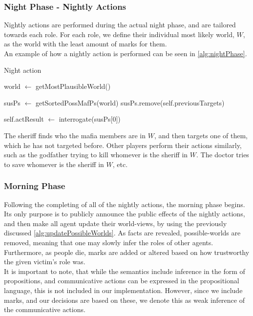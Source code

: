 \subsubsection{Night Phase - Nightly
	Actions}\label{sec:nightPhaseNightlyActions}
Nightly actions are performed during the actual night phase, and are tailored
towards each role. For each role, we define their individual most likely world,
$W$, as the world with the least amount of marks for them. \\ An example of how
a nightly action is performed can be seen in \cref{alg:nightPhase}.
\begin{algorithm}[H]
	\caption{Night action}
	\begin{algorithmic}[1]
		\State world $\gets$ getMostPlausibleWorld()

		\State susPs $\gets$ getSortedPossMafPs(world)
		\State susPs.remove(self.previousTargets)

		\State self.actResult $\gets$ interrogate(susPs[0])
		\EndIf
		\EndFunction

		\Statex
	\end{algorithmic}\label{alg:nightPhase}
\end{algorithm}
\setcounter{algorithmcaption}{7}
The sheriff finds who the mafia members are in $W$, and then targets one of
them, which he has not targeted before. Other players perform their actions
similarly, such as the godfather trying to kill whomever is the sheriff in $W$.
The doctor tries to save whomever is the sheriff in $W$, etc.

\subsubsection{Morning Phase}\label{sec:morningPhase}
Following the completing of all of the nightly actions, the morning phase
begins. Its only purpose is to publicly announce the public effects of the
nightly actions, and then make all agent update their world-views, by using the
previously discussed \cref{alg:updatePossibleWorlds}. As facts are
revealed, possible-worlds are removed, meaning that one may slowly infer the
roles of other agents. Furthermore, as people die, marks are added or altered
based on how trustworthy the given victim's role was. \\ It is important to
note, that while the semantics include inference in the form of propositions,
and communicative actions can be expressed in the propositional language, this
is not included in our implementation. However, since we include marks, and our
decisions are based on these, we denote this as weak inference of the
communicative actions.

